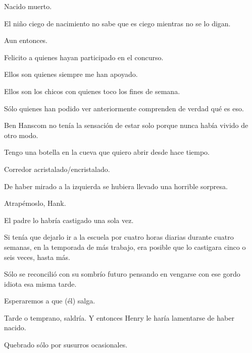 \sk
Nacido muerto. 

\sk
El niño ciego de nacimiento no sabe que es
ciego mientras no se lo digan.\nb{}

\sk
Aun entonces. 

\sk
Felicito a quienes hayan participado en el concurso. 

\sk
Ellos son quienes siempre me han apoyado. 

\sk
Ellos son los chicos con quienes toco los fines de semana. 

\sk
Sólo quienes han podido ver
anteriormente comprenden de verdad qué es eso.

\sk
Ben Hanscom no tenía la sensación de estar solo
porque nunca había vivido de otro modo.\nb{}

\sk
Tengo una botella en la cueva que quiero abrir desde hace tiempo. 

\sk
Corredor acristalado/encristalado. 

\sk
De haber
mirado a la izquierda se hubiera llevado una
horrible sorpresa. 

\sk
Atrapémoslo, Hank.

\sk
El padre lo habría castigado una sola vez. 

\sk
Si tenía que dejarlo ir a la escuela por cuatro horas
diarias durante cuatro semanas, en la temporada
de más trabajo, era posible que lo castigara cinco o
seis veces, hasta más.

\sk
Sólo se reconcilió con su
sombrío futuro pensando en vengarse con ese
gordo idiota esa misma tarde.
\nb{}

\sk
Esperaremos a que (él) salga.

\sk
Tarde o temprano, saldría. Y entonces Henry le
haría lamentarse de haber nacido.

\sk
Quebrado sólo por susurros
ocasionales. 

